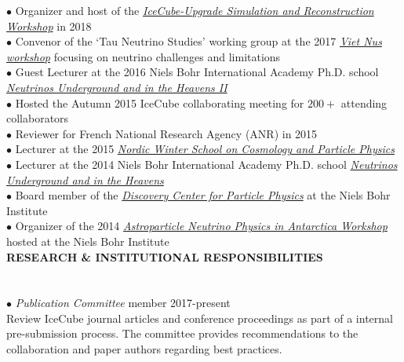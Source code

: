 \documentclass[a4paper,11pt]{article}
\renewcommand{\smallskip} {\vspace{0.1in}}
\begin{document}
%
$\bullet$ Organizer and host of the \href{https://indico.nbi.ku.dk/event/1101/}{\textit{IceCube-Upgrade Simulation and Reconstruction Workshop}} in 2018\smallskip \\
%
$\bullet$ Convenor of the `Tau Neutrino Studies' working group at the 2017 \href{https://sites.cns.utexas.edu/vietnus}{\textit{Viet Nus workshop}} focusing on neutrino challenges and limitations\smallskip \\
%
$\bullet$ Guest Lecturer at the 2016 Niels Bohr International Academy Ph.D. school \href{https://indico.nbi.ku.dk/conferenceDisplay.py?confId=859}{\textit{Neutrinos Underground and in the Heavens II}}\smallskip \\
%
$\bullet$ Hosted the Autumn 2015 IceCube collaborating meeting for $200+$ attending collaborators \smallskip \\
%
$\bullet$ Reviewer for French National Research Agency (ANR) in 2015\smallskip \\
%
$\bullet$ Lecturer at the 2015 \href{https://indico.nbi.ku.dk/conferenceDisplay.py?confId=743}{\textit{Nordic Winter School on Cosmology and Particle Physics}}\smallskip \\
%
$\bullet$ Lecturer at the 2014 Niels Bohr International Academy Ph.D. school \href{https://indico.nbi.ku.dk/conferenceDisplay.py?confId=690}{\textit{Neutrinos Underground and in the Heavens}}\smallskip \\
%
$\bullet$ Board member of the \href{http://discoverycenter.nbi.ku.dk/about_us/managing_board/}{\textit{Discovery Center for Particle Physics}} at the Niels Bohr Institute\smallskip \\
%
$\bullet$ Organizer of the 2014 \href{https://indico.nbi.ku.dk/conferenceDisplay.py?confId=620}{\textit{Astroparticle Neutrino Physics in Antarctica Workshop}} hosted at the Niels Bohr Institute\smallskip \\
%
%
%
%
\noindent
\textbf{RESEARCH \& INSTITUTIONAL RESPONSIBILITIES  ~~\hrulefill}\smallskip\\
%
\\
 \smallskip \\
%
$\bullet$ {\it Publication Committee} member \hfill 2017-present \vspace{0.1cm} \\
\indent \indent Review IceCube journal articles and conference proceedings as part of a internal pre-submission process. The committee provides recommendations to the collaboration and paper authors regarding best practices.
\end{document}
